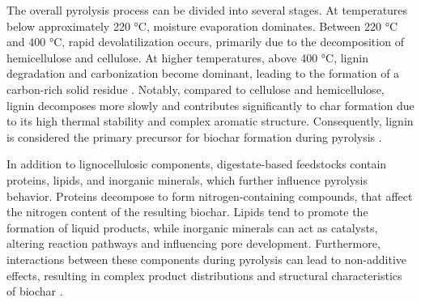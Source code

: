\vspace{0.3em}

The overall pyrolysis process can be divided into several stages. At temperatures below approximately 220 °C, moisture evaporation dominates. Between 220 °C and 400 °C, rapid devolatilization occurs, primarily due to the decomposition of hemicellulose and cellulose. At higher temperatures, above 400 °C, lignin degradation and carbonization become dominant, leading to the formation of a carbon-rich solid residue \cite{Yang2005,ElSayed2023}. Notably, compared to cellulose and hemicellulose, lignin decomposes more slowly and contributes significantly to char formation due to its high thermal stability and complex aromatic structure. Consequently, lignin is considered the primary precursor for biochar formation during pyrolysis \cite{Chen2022}.

\vspace{0.3em}

In addition to lignocellulosic components, digestate-based feedstocks contain proteins, lipids, and inorganic minerals, which further influence pyrolysis behavior. Proteins decompose to form nitrogen-containing compounds, that affect the nitrogen content of the resulting biochar\cite{Navarro2025}. Lipids tend to promote the formation of liquid products, while inorganic minerals can act as catalysts, altering reaction pathways and influencing pore development. Furthermore, interactions between these components during pyrolysis can lead to non-additive effects, resulting in complex product distributions and structural characteristics of biochar \cite{Puri2024,Kebelmann2013}.

